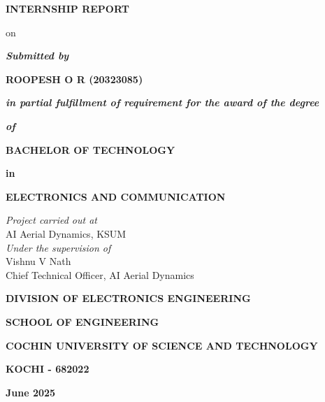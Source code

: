 \begin{titlepage}
	\titlepagefont
	\centering
	{\sectionFont \textbf{INTERNSHIP REPORT} \par}
	\vspace{.2cm}
	{\sectionFont on \par}
	\vspace{.4cm}

	{ \par}

	\vspace{.7cm}

	\textit{\textbf{Submitted by}} \par
	\vspace{.5cm}

	\textbf {ROOPESH O R (20323085)} \par

	\vspace{.8cm}
	\textit{\textbf{in partial fulfillment of requirement for the award of the degree} }\par
	\textit{\textbf{of}} \par
	\vspace{.6cm}
	\textbf{BACHELOR OF TECHNOLOGY} \par
	\textbf{in} \par
	\textbf{ELECTRONICS AND COMMUNICATION} \par
	\vspace{.6cm}

	\par

	\vspace{.8cm}
	
	\textit {Project carried out at}\\
	AI Aerial Dynamics, KSUM\\[10pt]
	\textit {Under the supervision of} \\
	Vishnu V Nath \\ 
	Chief Technical Officer, AI Aerial Dynamics

	\vspace{1cm}

	\textbf{DIVISION OF ELECTRONICS ENGINEERING} \par
	\textbf{SCHOOL OF ENGINEERING} \par
	\textbf{COCHIN UNIVERSITY OF SCIENCE AND TECHNOLOGY} \par
	\textbf{KOCHI - 682022} \par

	\vspace{.5cm}

	\textbf{June 2025} \par

	\vspace*{\fill}

\end{titlepage}